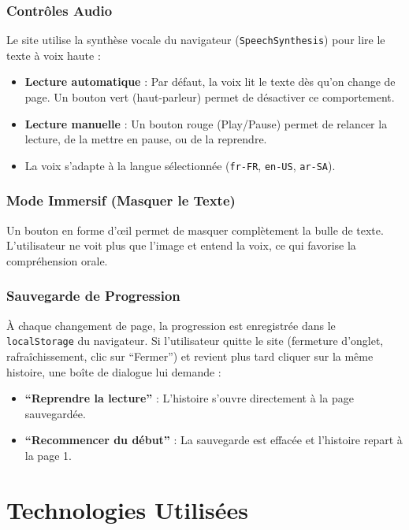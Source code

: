 \documentclass[12pt,twoside,letterpaper]{article}
\begin{document}
\subsubsection{Contrôles Audio}
Le site utilise la synthèse vocale du navigateur (\texttt{SpeechSynthesis}) pour lire le texte à voix haute :
\begin{itemize}
    \item \textbf{Lecture automatique} : Par défaut, la voix lit le texte dès qu'on change de page. Un bouton vert (haut-parleur) permet de désactiver ce comportement.
    \item \textbf{Lecture manuelle} : Un bouton rouge (Play/Pause) permet de relancer la lecture, de la mettre en pause, ou de la reprendre.
    \item La voix s'adapte à la langue sélectionnée (\texttt{fr-FR}, \texttt{en-US}, \texttt{ar-SA}).
\end{itemize}

\subsubsection{Mode Immersif (Masquer le Texte)}
Un bouton en forme d'œil permet de masquer complètement la bulle de texte. L'utilisateur ne voit plus que l'image et entend la voix, ce qui favorise la compréhension orale.

\subsubsection{Sauvegarde de Progression}
À chaque changement de page, la progression est enregistrée dans le \texttt{localStorage} du navigateur. Si l'utilisateur quitte le site (fermeture d'onglet, rafraîchissement, clic sur ``Fermer'') et revient plus tard cliquer sur la même histoire, une boîte de dialogue lui demande :
\begin{itemize}
    \item \textbf{``Reprendre la lecture''} : L'histoire s'ouvre directement à la page sauvegardée.
    \item \textbf{``Recommencer du début''} : La sauvegarde est effacée et l'histoire repart à la page 1.
\end{itemize}

\newpage
\section{Technologies Utilisées}
\end{document}
